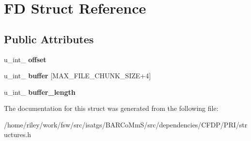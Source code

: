 \hypertarget{struct_f_d}{}\section{FD Struct Reference}
\label{struct_f_d}
\subsection*{Public Attributes}
\begin{DoxyCompactItemize}
\item 
u\+\_\+int\+\_ {\bfseries offset}\hypertarget{struct_f_d_aa7a398c7effa71d334cd242533f19e51}{}\label{struct_f_d_aa7a398c7effa71d334cd242533f19e51}

\item 
u\+\_\+int\+\_ {\bfseries buffer} \mbox{[}M\+A\+X\+\_\+\+F\+I\+L\+E\+\_\+\+C\+H\+U\+N\+K\+\_\+\+S\+I\+ZE+4\mbox{]}\hypertarget{struct_f_d_a3df38bc90ee8c4d6390784d6afa508c5}{}\label{struct_f_d_a3df38bc90ee8c4d6390784d6afa508c5}

\item 
u\+\_\+int\+\_ {\bfseries buffer\+\_\+length}\hypertarget{struct_f_d_a9389d66689b2b1ba0f38e3c023b5eb42}{}\label{struct_f_d_a9389d66689b2b1ba0f38e3c023b5eb42}

\end{DoxyCompactItemize}


The documentation for this struct was generated from the following file\+:\begin{DoxyCompactItemize}
\item 
/home/riley/work/fsw/src/isatgs/\+B\+A\+R\+Co\+Mm\+S/src/dependencies/\+C\+F\+D\+P/\+P\+R\+I/structures.\+h\end{DoxyCompactItemize}
